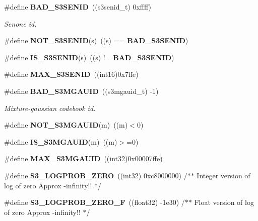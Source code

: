 \begin{DoxyCompactItemize}
\item 
\#define {\bf B\-A\-D\-\_\-\-S3\-S\-E\-N\-I\-D}~((s3senid\-\_\-t) 0xffff)\label{s3types_8h_a072c42ea82002d9435305133750c4e2e}

\begin{DoxyCompactList}\small\item\em Senone id. \end{DoxyCompactList}\item 
\#define {\bfseries N\-O\-T\-\_\-\-S3\-S\-E\-N\-I\-D}(s)~((s) == {\bf B\-A\-D\-\_\-\-S3\-S\-E\-N\-I\-D})\label{s3types_8h_a48cd9804ec6b0647f147d6e979f3de74}

\item 
\#define {\bfseries I\-S\-\_\-\-S3\-S\-E\-N\-I\-D}(s)~((s) != {\bf B\-A\-D\-\_\-\-S3\-S\-E\-N\-I\-D})\label{s3types_8h_aad006f5edbf6b42a4dfcc398d1403316}

\item 
\#define {\bfseries M\-A\-X\-\_\-\-S3\-S\-E\-N\-I\-D}~((int16)0x7ffe)\label{s3types_8h_ab704f3bdb72f51ccac7f7388644d37f1}

\item 
\#define {\bf B\-A\-D\-\_\-\-S3\-M\-G\-A\-U\-I\-D}~((s3mgauid\-\_\-t) -\/1)\label{s3types_8h_a08bccaa82b9d1990a9a98368a1091ff6}

\begin{DoxyCompactList}\small\item\em Mixture-\/gaussian codebook id. \end{DoxyCompactList}\item 
\#define {\bfseries N\-O\-T\-\_\-\-S3\-M\-G\-A\-U\-I\-D}(m)~((m)$<$0)\label{s3types_8h_ab1d53f52278ec85cfe171bee12695618}

\item 
\#define {\bfseries I\-S\-\_\-\-S3\-M\-G\-A\-U\-I\-D}(m)~((m)$>$=0)\label{s3types_8h_ad1e1aaef79517a20741015c485690e31}

\item 
\#define {\bfseries M\-A\-X\-\_\-\-S3\-M\-G\-A\-U\-I\-D}~((int32)0x00007ffe)\label{s3types_8h_a85f630c5da85e5490f9b4a873f9dc187}

\item 
\#define {\bfseries S3\-\_\-\-L\-O\-G\-P\-R\-O\-B\-\_\-\-Z\-E\-R\-O}~((int32) 0xc8000000)	/$\ast$$\ast$ Integer version of log of zero Approx -\/infinity!! $\ast$/\label{s3types_8h_a227b2026462b1665a6508388099afcfe}

\item 
\#define {\bfseries S3\-\_\-\-L\-O\-G\-P\-R\-O\-B\-\_\-\-Z\-E\-R\-O\-\_\-\-F}~((float32) -\/1e30)	/$\ast$$\ast$ Float version of log of zero Approx -\/infinity!! $\ast$/\label{s3types_8h_a8d5747af7c36ef6208617e1b5db06cf0}


\end{DoxyCompactItemize}
